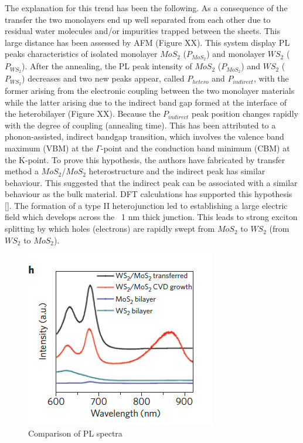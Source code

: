 The explanation for this trend has been the following.  As a consequence of the transfer the two monolayers end up well separated from each other due to residual water molecules and/or impurities trapped between the sheets. This large distance has been assessed by AFM (Figure XX). This system display PL peaks characteristics of isolated monolayer $MoS_2$ ($P_{MoS_2}$) and monolayer $WS_2$ ($P_{WS_2}$). After the annealing, the PL peak intensity of $MoS_2$ ($P_{MoS_2}$) and $WS_2$ ($P_{WS_2}$) decreases and two new peaks appear, called $P_{hetero}$ and $P_{indirect}$, with the former arising from the electronic coupling between the two monolayer materials while the latter arising due to the indirect band gap formed at the interface of the heterobilayer (Figure XX). Because the $P_{indirect}$ peak position changes rapidly with the degree of coupling (annealing time). This has been attributed to a phonon-assisted, indirect bandgap transition, which involves the valence band maximum (VBM) at the {$\Gamma$}-point and the conduction band minimum (CBM) at the K-point. To prove this hypothesis, the authors have fabricated by transfer method a $MoS_2$/$MoS_2$ heterostructure and the indirect peak has similar behaviour. This suggested that the indirect peak can be associated with a similar behaviour as the bulk material. DFT calculations has supported this hypothesis []. The formation of a type II heterojunction led to establishing a large electric field which develops across the ~1 nm thick junction. This leads to strong exciton splitting by which holes (electrons) are rapidly swept from $MoS_2$ to $WS_2$ (from $WS_2$  to $MoS_2$).

\begin{figure}[h]
	\begin{center}
		\includegraphics[scale=1]{Heterostructures/HeterostructurePLSpectrumIntroComparison.png}
		\caption{Comparison of PL spectra}
		\label{fig:HeterostructurePLSpectrumIntroComparison}
	\end{center}
\end{figure}

